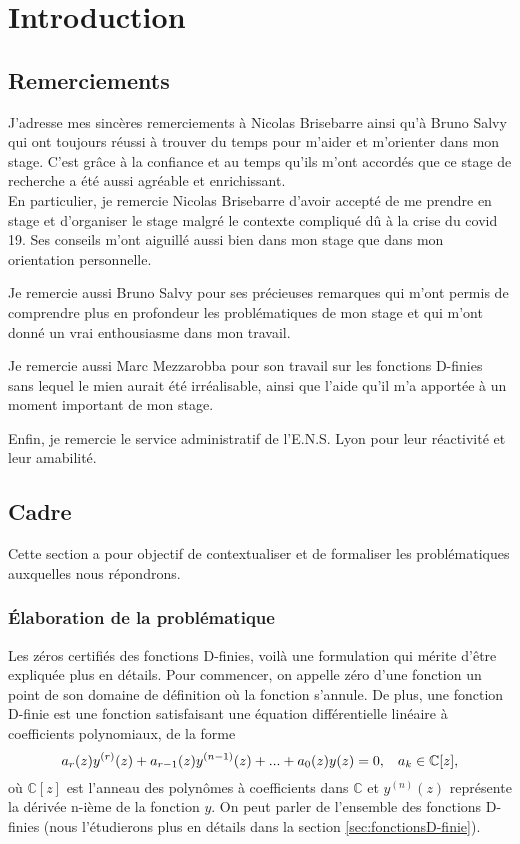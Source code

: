 \documentclass[a4paper,10pt]{article}
\begin{document}
	\section{Introduction}
	\subsection{Remerciements}
	\label{subsec:intro}
	
	J'adresse mes sincères remerciements à Nicolas Brisebarre ainsi qu'à Bruno Salvy qui ont toujours réussi à trouver du temps pour m'aider et m'orienter dans mon stage.  C'est grâce à la confiance et au temps qu'ils m'ont accordés que ce stage de recherche a été aussi agréable et enrichissant.
	\\
	
	En particulier, je remercie Nicolas Brisebarre d'avoir accepté de me prendre en stage et d'organiser le stage malgré le contexte compliqué dû à la crise du covid 19. Ses conseils m'ont aiguillé aussi bien dans mon stage que dans mon orientation personnelle. 
	
	Je remercie aussi Bruno Salvy pour ses précieuses remarques qui m'ont permis de comprendre plus en profondeur les problématiques de mon stage et qui m'ont donné un vrai enthousiasme dans mon travail. 
	
	Je remercie aussi Marc Mezzarobba pour son travail sur les fonctions D-finies sans lequel le mien aurait été irréalisable, ainsi que l'aide qu'il m'a apportée à un moment important de mon stage.
	
	Enfin, je remercie le service administratif de l'E.N.S. Lyon pour leur réactivité et leur amabilité.
	
	
	\subsection{Cadre}
	Cette section a pour objectif de contextualiser et de formaliser les problématiques auxquelles nous répondrons.
	\subsubsection{Élaboration de la problématique}
	Les zéros certifiés des fonctions D-finies, voilà une formulation qui mérite d'être expliquée plus en détails. Pour commencer, on appelle zéro d'une fonction un point de son domaine de définition où la fonction s'annule.
	De plus, une fonction D-finie est une fonction satisfaisant une équation différentielle linéaire à coefficients polynomiaux, de la forme
	\[a_{r}(z)y^{(r)}(z)+a_{r-1}(z)y^{(n-1)}(z)+...+a_{0}(z)y(z)=0, \hspace{3mm} a_{k}\in \mathbb{C}[z],\]
	où $\mathbb{C}[z]$ est l'anneau des polynômes à coefficients dans $\mathbb{C}$ et $y^{(n)}(z)$ représente la dérivée n-ième de la fonction $y$. On peut parler de l'ensemble des fonctions D-finies (nous l'étudierons plus en détails dans la section \ref{sec:fonctionsD-finie}). 
	
\end{document}
